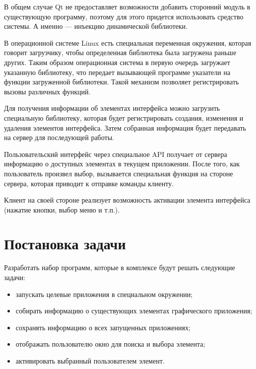 В общем случае Qt не предоставляет возможности добавить сторонний модуль в
существующую программу, поэтому для этого придется использовать средство
системы. А именно --- инъекцию динамической библиотеки.

В операционной системе Linux есть специальная переменная окружения, которая
говорит загрузчику, чтобы определенная библиотека была загружена раньше других.
Таким образом  операционная система в первую очередь загружает указанную
библиотеку, что передает вызывающей программе указатели на функции загруженной
библиотеки. Такой механизм позволяет регистрировать вызовы различных функций.

Для получения информации об элементах интерфейса можно загрузить специальную
библиотеку, которая будет регистрировать создания, изменения и удаления
элементов интерфейса. Затем собранная информация будет передавать на сервер для
последующей работы.

Пользовательский интерфейс через специальное API получает от сервера информацию
о доступных элементах в текущем приложении. После того, как пользователь
произвел выбор, вызывается специальная функция на стороне сервера, которая
приводит к отправке команды клиенту.

Клиент на своей стороне реализует возможность активации элемента интерфейса
(нажатие кнопки, выбор меню и т.п.).

\section{Постановка задачи}

Разработать набор программ, которые в комплексе будут решать следующие задачи:
\begin{itemize}
	\item запускать целевые приложения в специальном окружении;
	\item собирать информацию о существующих элементах графического приложения;
	\item сохранять информацию о всех запущенных приложениях;
	\item отображать пользователю окно для поиска и выбора элемента;
	\item активировать выбранный пользователем элемент.
\end{itemize}
